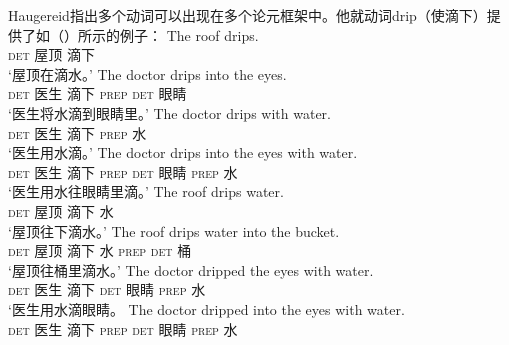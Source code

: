 \begin{exe}
\begin{xlist}[iv.]
\begin{exe}
\begin{xlist}[iv.]
\noindent
Haugereid指出多个动词可以出现在多个论元框架中。他就动词drip（使滴下）提供了如（）所示的例子：
\eal
\settowidth{}
\ex
\gll The roof drips.                    \\
     \textsc{det} 屋顶 滴下\\
\glt `屋顶在滴水。' 
\ex
\gll The doctor drips into the eyes.    \\
     \textsc{det} 医生 滴下 \textsc{prep} \textsc{det} 眼睛\\
\glt `医生将水滴到眼睛里。' 
\ex
\gll The doctor drips with water.       \\
     \textsc{det} 医生 滴下 \textsc{prep} 水\\
\glt `医生用水滴。' 
\ex
\gll The doctor drips into the eyes with water. \\
     \textsc{det} 医生 滴下 \textsc{prep} \textsc{det} 眼睛 \textsc{prep} 水\\
\glt `医生用水往眼睛里滴。' 
\ex
\gll The roof drips water.                      \\
     \textsc{det} 屋顶 滴下 水\\
\glt `屋顶往下滴水。' 
\ex
\gll The roof drips water into the bucket.      \\
     \textsc{det} 屋顶 滴下 水 \textsc{prep} \textsc{det} 桶\\
\glt `屋顶往桶里滴水。' 
\ex
\gll The doctor dripped the eyes with water.    \\
     \textsc{det} 医生 滴下 \textsc{det} 眼睛 \textsc{prep} 水\\
\glt `医生用水滴眼睛。
\ex
\gll The doctor dripped into the eyes with water. \\
     \textsc{det} 医生 滴下 \textsc{prep} \textsc{det} 眼睛 \textsc{prep} 水\\

\end{xlist}
\end{exe}
\end{xlist}
\end{exe}
